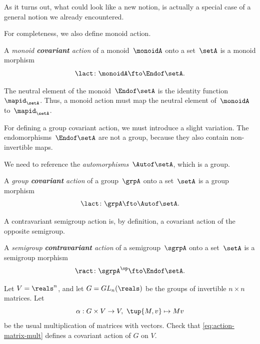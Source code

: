 As it turns out, what could look like a new notion, is actually a special case of a general notion we already encountered.

For completeness, we also define monoid action.

\begin{ctdefinition}\label{def:monoid-cov-action}
  A \emph{monoid \textbf{covariant} action} of a monoid~$\monoidA$ onto a set~$\setA$ is a monoid morphism
  \begin{equation}\label{eq:act-monoid}
    \lact \colon \monoidA \fto \Endof\setA.
  \end{equation}
\end{ctdefinition}

The neutral element of the monoid~$\Endof\setA$ is the identity function~$\mapid_{\setA}$.
Thus, a monoid action must map the neutral element of~$\monoidA$ to~$\mapid_{\setA}$.
%


For defining a group covariant action, we must introduce a slight variation.
The endomorphisms~$\Endof\setA$ are not a group, because they also contain non-invertible maps.

We need to reference the \emph{automorphisms}~$\Autof\setA$, which is a group.

\begin{ctdefinition}\label{def:group-cov-action}
  A \emph{group \textbf{covariant} action} of a group~$\grpA$ onto a set~$\setA$ is a group morphism
  \begin{equation}\label{eq:act-group}
    \lact \colon \grpA \fto \Autof\setA.
  \end{equation}
\end{ctdefinition}

A contravariant semigroup action is, by definition, a covariant action of the opposite semigroup.

\begin{ctdefinition}\label{def:semigroup-cont-action}
  A \emph{semigroup \textbf{contravariant} action} of a semigroup~$\sgrpA$ onto a set~$\setA$ is a semigroup morphism
  \begin{equation}
    \ract \colon \sgrpA^{\op} \fto \Endof\setA.
  \end{equation}
\end{ctdefinition}


\begin{gradedexercise}\label{ex:MatrixMultAction}
Let $V = \reals^n$, and let $G = GL_n(\reals)$ be the groups of invertible $n \times n$ matrices. Let 
\begin{equation}\label{eq:action-matrix-mult}
\alpha : G \times V \rightarrow V, \ \tup{M, v} \mapsto Mv
\end{equation}
be the usual multiplication of matrices with vectors. Check that \cref{eq:action-matrix-mult} defines a covariant action of $G$ on $V$. 
\end{gradedexercise}
